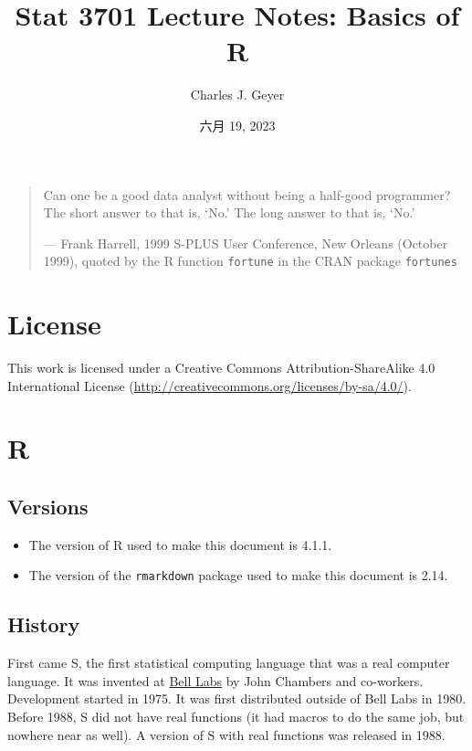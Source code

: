 \documentclass[
]{article}
\title{Stat 3701 Lecture Notes: Basics of R}
\author{Charles J. Geyer}
\date{六月 19, 2023}
\begin{document}
\maketitle

\begin{quote}
Can one be a good data analyst without being a half-good programmer? The
short answer to that is, `No.' The long answer to that is, `No.'

--- Frank Harrell, 1999 S-PLUS User Conference, New Orleans (October
1999), quoted by the R function \texttt{fortune} in the CRAN package
\texttt{fortunes}
\end{quote}

\hypertarget{license}{%
\section{License}\label{license}}

This work is licensed under a Creative Commons Attribution-ShareAlike
4.0 International License
(\url{http://creativecommons.org/licenses/by-sa/4.0/}).

\hypertarget{r}{%
\section{R}\label{r}}

\hypertarget{versions}{%
\subsection{Versions}\label{versions}}

\begin{itemize}
\item
  The version of R used to make this document is 4.1.1.
\item
  The version of the \texttt{rmarkdown} package used to make this
  document is 2.14.
\end{itemize}

\hypertarget{history}{%
\subsection{History}\label{history}}

First came S, the first statistical computing language that was a real
computer language. It was invented at
\href{https://en.wikipedia.org/w/index.php?title=Bell_Labs\&oldid=827987152}{Bell
Labs} by John Chambers and co-workers. Development started in 1975. It
was first distributed outside of Bell Labs in 1980. Before 1988, S did
not have real functions (it had macros to do the same job, but nowhere
near as well). A version of S with real functions was released in 1988.
\end{document}
